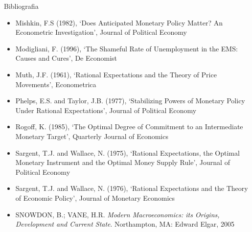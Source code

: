 \documentclass[10pt]{beamer}
\begin{document}
\begin{frame}{ Bibliografia}
    \begin{itemize}                        
        \item Mishkin, F.S (1982), ‘Does Anticipated Monetary Policy Matter? An Econometric Investigation’, Journal of Political Economy\medskip        
        \item Modigliani, F. (1996), ‘The Shameful Rate of Unemployment in the EMS: Causes and Cures’, De Economist\medskip
        \item Muth, J.F. (1961), ‘Rational Expectations and the Theory of Price Movements’,  Econometrica\medskip        
        \item Phelps, E.S. and Taylor, J.B. (1977), ‘Stabilizing Powers of Monetary Policy Under Rational Expectations’, Journal of Political Economy\medskip
        \item Rogoff, K. (1985), ‘The Optimal Degree of Commitment to an Intermediate Monetary Target’, Quarterly Journal of Economics\medskip
        \item Sargent, T.J. and Wallace, N. (1975), ‘Rational Expectations, the Optimal Monetary Instrument and the Optimal Money Supply Rule’, Journal of Political Economy\medskip
        \item Sargent, T.J. and Wallace, N. (1976), ‘Rational Expectations and the Theory of Economic Policy’, Journal of Monetary Economics\medskip
        \item SNOWDON, B.; VANE, H.R. \emph{Modern Macroeconomics: its Origins, Development and Current State}. Northampton, MA: Edward Elgar, 2005\medskip                
    \end{itemize}
\end{frame}
\end{document}

